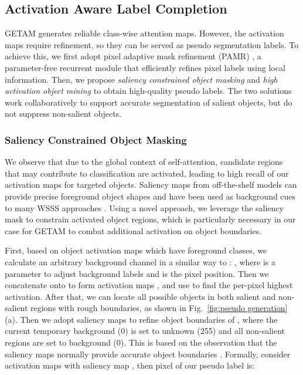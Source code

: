 \documentclass[10pt,twocolumn,letterpaper]{article}
\begin{document}
\subsection{Activation Aware Label Completion}
GETAM generates reliable class-wise attention maps.
However, the activation maps require refinement, so they can be served as pseudo segmentation labels.
To achieve this, 
we first adopt pixel adaptive mask refinement (PAMR) \cite{Araslanov_2020_CVPR},
a parameter-free recurrent module that efficiently refines pixel labels using local information. 
Then, we propose
\textit{saliency constrained object masking} and \textit{high activation object mining} to obtain high-quality pseudo 
labels. 
The two solutions work collaboratively to
support accurate segmentation of salient objects, but do not suppress non-salient objects. 


\subsubsection{Saliency Constrained Object Masking}
We observe that due to the global context of self-attention, candidate regions that may contribute to classification
are activated, leading to high recall of our activation maps for targeted objects.
Saliency maps from off-the-shelf models can provide precise foreground object shapes and have been used as background cues to many WSSS approaches \cite{fan2020learning,jiang2019integral,lee2019ficklenet,sun2020mining,wang2018weakly,lee2021railroad,yao2021non}. 
Using a novel approach, we leverage 
the saliency mask to constrain activated object regions, which is particularly necessary in our case for GETAM to combat additional activation on object boundaries.


First, based on object activation maps  which have  foreground classes, 
we calculate an arbitrary background channel in a similar way to \cite{ahn2018learning}: 
, 
where  is a parameter to adjust background labels and
 is the pixel position.
Then we concatenate 
 onto  to form activation maps ,
and use  to find the per-pixel highest activation.
After that, we can locate all possible objects in both salient and non-salient regions with rough boundaries, as shown in Fig.~\ref{fig:pseudo generation} (a).
Then we adopt saliency maps 
to refine object boundaries of , where
the current temporary background (0) is set to unknown (255) and
all non-salient regions 
are set to background (0).
This is based on the observation
that the saliency maps normally provide accurate object boundaries \cite{yao2021non,lee2021railroad,wang2021weakly}. 
Formally, consider activation maps  with saliency map , then pixel  of our pseudo label  is:
\end{document}
